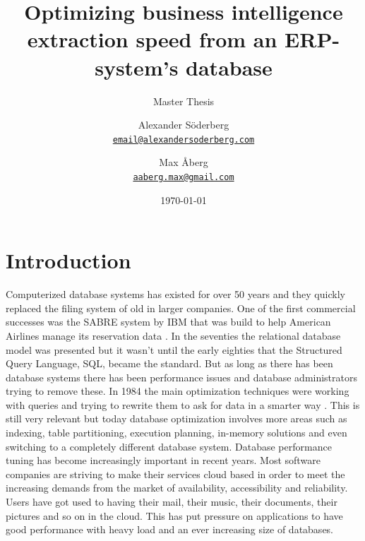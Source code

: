 \documentclass{cslthse-msc}
\author{
	Alexander Söderberg \\
	{\normalsize \href{mailto:email@alexandersoderberg.com}{\texttt{email@alexandersoderberg.com}}}
	\and
	Max Åberg \\
    {\normalsize \href{mailto:aaberg.max@gmail.com}{\texttt{aaberg.max@gmail.com}}}
}
\title{Optimizing business intelligence
extraction speed from an
ERP-system’s database}
\subtitle{Master Thesis}
\date{\today}
\begin{document}
\makefrontmatter

\chapter[Introduction]{Introduction}
Computerized database systems has existed for over 50 years and they quickly replaced the filing system of old in larger companies. One of the first commercial successes was the SABRE system by IBM that was build to help American Airlines manage its reservation data \cite{Head02}. In the seventies the relational database model was presented but it wasn't until the early eighties that the Structured Query Language, SQL, became the standard. But as long as there has been database systems there has been performance issues and database administrators trying to remove these. In 1984 the main optimization techniques were working with queries and trying to rewrite them to ask for data in a smarter way \cite{jarke1984query}. This is still very relevant but today database optimization involves more areas such as indexing, table partitioning, execution planning, in-memory solutions and even switching to a completely different database system.
Database performance tuning has become increasingly important in recent years. Most software companies are striving to make their services cloud based in order to meet the increasing demands from the market of availability, accessibility and reliability. Users have got used to having their mail, their music, their documents, their pictures and so on in the cloud. This has put pressure on applications to have good performance with heavy load and an ever increasing size of databases.\\\\
\end{document}
